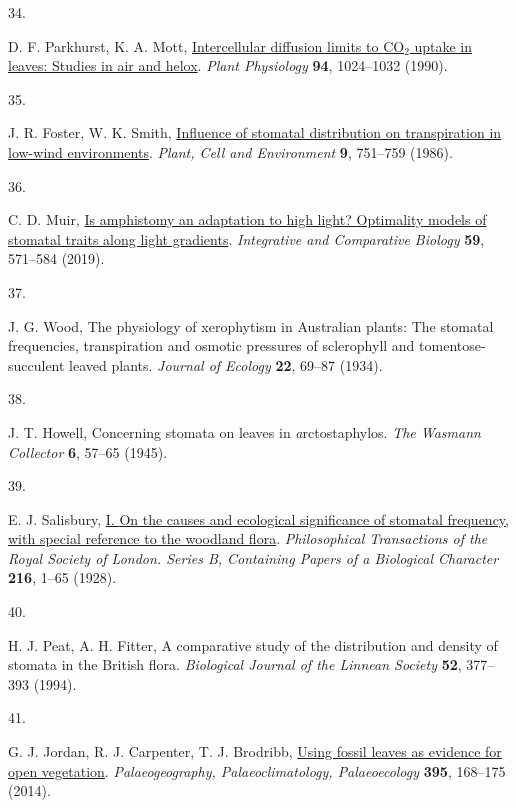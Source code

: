 \documentclass[
  letterpaper,
  DIV=11,
  numbers=noendperiod]{scrartcl}
\newlength{\cslhangindent}
\newlength{\csllabelwidth}
\newenvironment{CSLReferences}[2] %
 {\begin{list}{}{%
  \setlength{\itemindent}{0pt}
  \setlength{\leftmargin}{0pt}
  \setlength{\parsep}{0pt}
  \ifodd #1
   \setlength{\leftmargin}{\cslhangindent}
   \setlength{\itemindent}{-1\cslhangindent}
  \fi
  \setlength{\itemsep}{#2\baselineskip}}}
 {\end{list}}
\newcommand{\CSLLeftMargin}[1]{\parbox[t]{\csllabelwidth}{\strut#1\strut}}
\newcommand{\CSLRightInline}[1]{\parbox[t]{\linewidth - \csllabelwidth}{\strut#1\strut}}
\begin{document}
\begin{CSLReferences}{0}{1}
\CSLLeftMargin{34. }%
\CSLRightInline{D. F. Parkhurst, K. A. Mott,
\href{https://doi.org/10.1104/pp.94.3.1024}{Intercellular diffusion
limits to {CO}\(_{\textrm{2}}\) uptake in leaves: Studies in air and
helox}. \emph{Plant Physiology} \textbf{94}, 1024--1032 (1990).}

\CSLLeftMargin{35. }%
\CSLRightInline{J. R. Foster, W. K. Smith,
\href{https://doi.org/10.1111/j.1365-3040.1986.tb02108.x}{Influence of
stomatal distribution on transpiration in low-wind environments}.
\emph{Plant, Cell and Environment} \textbf{9}, 751--759 (1986).}

\CSLLeftMargin{36. }%
\CSLRightInline{C. D. Muir, \href{https://doi.org/10.1093/icb/icz085}{Is
amphistomy an adaptation to high light? {Optimality} models of stomatal
traits along light gradients}. \emph{Integrative and Comparative
Biology} \textbf{59}, 571--584 (2019).}

\CSLLeftMargin{37. }%
\CSLRightInline{J. G. Wood, The physiology of xerophytism in
{Australian} plants: The stomatal frequencies, transpiration and osmotic
pressures of sclerophyll and tomentose-succulent leaved plants.
\emph{Journal of Ecology} \textbf{22}, 69--87 (1934).}

\CSLLeftMargin{38. }%
\CSLRightInline{J. T. Howell, Concerning stomata on leaves in
\emph{a}rctostaphylos. \emph{The Wasmann Collector} \textbf{6}, 57--65
(1945).}

\CSLLeftMargin{39. }%
\CSLRightInline{E. J. Salisbury,
\href{https://doi.org/10.1098/rstb.1928.0001}{I. {On} the causes and
ecological significance of stomatal frequency, with special reference to
the woodland flora}. \emph{Philosophical Transactions of the Royal
Society of London. Series B, Containing Papers of a Biological
Character} \textbf{216}, 1--65 (1928).}

\CSLLeftMargin{40. }%
\CSLRightInline{H. J. Peat, A. H. Fitter, A comparative study of the
distribution and density of stomata in the {British} flora.
\emph{Biological Journal of the Linnean Society} \textbf{52}, 377--393
(1994).}

\CSLLeftMargin{41. }%
\CSLRightInline{G. J. Jordan, R. J. Carpenter, T. J. Brodribb,
\href{https://doi.org/10.1016/j.palaeo.2013.12.035}{Using fossil leaves
as evidence for open vegetation}. \emph{Palaeogeography,
Palaeoclimatology, Palaeoecology} \textbf{395}, 168--175 (2014).}


\end{CSLReferences}
\end{document}
